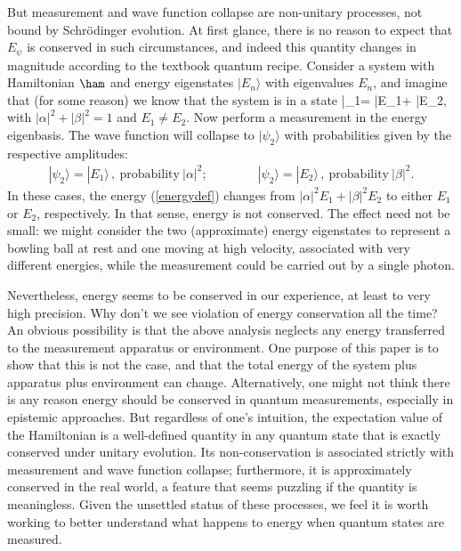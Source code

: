\documentclass[12pt,aps,prd,onecolumn,nofootinbib,notitlepage]{revtex4-1}
\begin{document}
But measurement and wave function collapse are non-unitary processes, not bound by Schr\"odinger evolution.
At first glance, there is no reason to expect that $E_\psi$ is conserved in such circumstances, and indeed this quantity changes in magnitude according to the textbook quantum recipe.
Consider a system with Hamiltonian $\ham$ and energy eigenstates $|E_n\rangle$ with eigenvalues $E_n$, and imagine that (for some reason) we know that the system is in a state
\be
  |\psi_1\rangle = \alpha |E_1\rangle + \beta |E_2\rangle,
  \label{energysuperposition}
\ee
with $|\alpha|^2+|\beta|^2 = 1$ and $E_1\neq E_2$.
Now perform a measurement in the energy eigenbasis.
The wave function will collapse to $|\psi_2\rangle$ with probabilities given by the respective amplitudes:
\begin{align}
  |\psi_2\rangle = |E_1\rangle\,, \  \mathrm{probability\ }|\alpha|^2;\qquad \qquad 
  |\psi_2\rangle = |E_2\rangle\,,\  \mathrm{probability\ }|\beta|^2.
\end{align}
In these cases, the energy (\ref{energydef}) changes from $|\alpha|^2 E_1 + |\beta|^2 E_2$ to either $E_1$ or $E_2$, respectively. 
In that sense, energy is not conserved.
The effect need not be small: we might consider the two (approximate) energy eigenstates to represent a bowling ball at rest and one moving at high velocity, associated with very different energies, while the measurement could be carried out by a single photon.

Nevertheless, energy seems to be conserved in our experience, at least to very high precision. 
Why don't we see violation of energy conservation all the time? 
An obvious possibility is that the above analysis neglects any energy transferred to the measurement apparatus or environment. 
One purpose of this paper is to show that this is not the case, and that the total energy of the system plus apparatus plus environment can change.
Alternatively, one might not think there is any reason energy should be conserved in quantum measurements, especially in epistemic approaches.
But regardless of one's intuition, the expectation value of the Hamiltonian is a well-defined quantity in any quantum state that is exactly conserved under unitary evolution.
Its non-conservation is associated strictly with measurement and wave function collapse; furthermore, it is approximately conserved in the real world, a feature that seems puzzling if the quantity is meaningless.
Given the unsettled status of these processes, we feel it is worth working to better understand what happens to energy when quantum states are measured.
\end{document}
